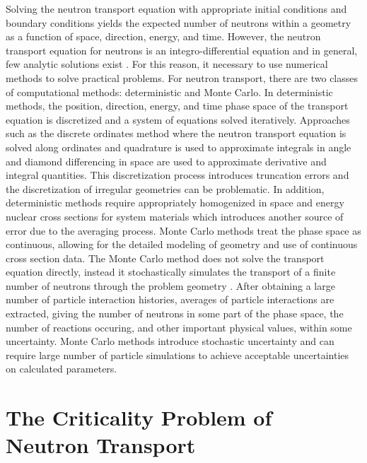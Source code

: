 Solving the neutron transport equation with appropriate initial conditions and boundary conditions yields the expected number of neutrons within a geometry as a function of space, direction, energy, and time. However, the neutron transport equation for neutrons is an integro-differential equation and in general, few analytic solutions exist \cite{lewis_computational_1984}. For this reason, it necessary to use numerical methods to solve practical problems. For neutron transport, there are two classes of computational methods: deterministic and Monte Carlo. In deterministic methods, the position, direction, energy, and time phase space of the transport equation is discretized and a system of equations solved iteratively. Approaches such as the discrete ordinates method where the neutron transport equation is solved along ordinates and quadrature is used to approximate integrals in angle and diamond differencing in space are used to approximate derivative and integral quantities. This discretization process introduces truncation errors and the discretization of irregular geometries can be problematic. In addition, deterministic methods require appropriately homogenized in space and energy nuclear cross sections for system materials which introduces another source of error due to the averaging process. Monte Carlo methods treat the phase space as continuous, allowing for the detailed modeling of geometry and use of continuous cross section data. The Monte Carlo method does not solve the transport equation directly, instead it stochastically simulates the transport of a finite number of neutrons through the problem geometry \cite{lux_monte_1991}. After obtaining a large number of particle interaction histories, averages of particle interactions are extracted, giving the number of neutrons in some part of the phase space, the number of reactions occuring, and other important physical values, within some uncertainty. Monte Carlo methods introduce stochastic uncertainty and can require large number of particle simulations to achieve acceptable uncertainties on calculated parameters.

\section{The Criticality Problem of Neutron Transport}


